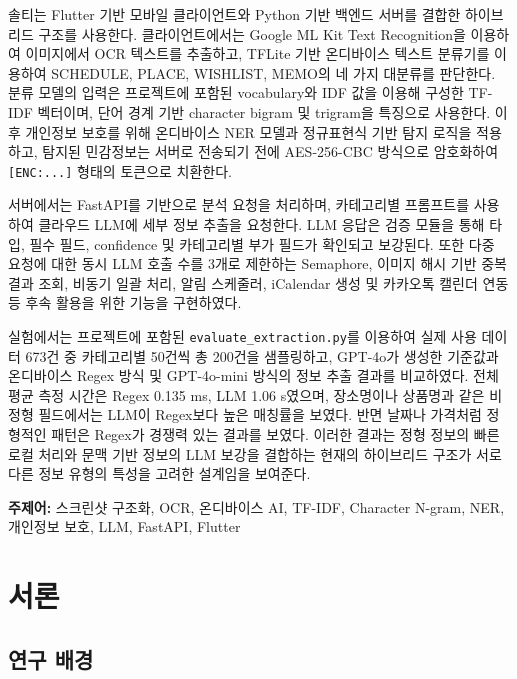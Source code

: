 \documentclass[11pt,a4paper]{article}
\begin{document}
솔티는 Flutter 기반 모바일 클라이언트\cite{ref_flutter}와 Python 기반 백엔드 서버를 결합한 하이브리드 구조를 사용한다. 클라이언트에서는 Google ML Kit Text Recognition을 이용하여 이미지에서 OCR 텍스트를 추출하고, TFLite 기반 온디바이스 텍스트 분류기를 이용하여 SCHEDULE, PLACE, WISHLIST, MEMO의 네 가지 대분류를 판단한다. 분류 모델의 입력은 프로젝트에 포함된 vocabulary와 IDF 값을 이용해 구성한 TF-IDF 벡터이며, 단어 경계 기반 character bigram 및 trigram을 특징으로 사용한다. 이후 개인정보 보호를 위해 온디바이스 NER 모델과 정규표현식 기반 탐지 로직을 적용하고, 탐지된 민감정보는 서버로 전송되기 전에 AES-256-CBC 방식으로 암호화하여 \texttt{[ENC:...]} 형태의 토큰으로 치환한다.

서버에서는 FastAPI를 기반으로 분석 요청을 처리하며, 카테고리별 프롬프트를 사용하여 클라우드 LLM에 세부 정보 추출을 요청한다. LLM 응답은 검증 모듈을 통해 타입, 필수 필드, confidence 및 카테고리별 부가 필드가 확인되고 보강된다. 또한 다중 요청에 대한 동시 LLM 호출 수를 3개로 제한하는 Semaphore, 이미지 해시 기반 중복 결과 조회, 비동기 일괄 처리, 알림 스케줄러, iCalendar 생성 및 카카오톡 캘린더 연동 등 후속 활용을 위한 기능을 구현하였다.

실험에서는 프로젝트에 포함된 \texttt{evaluate\_extraction.py}를 이용하여 실제 사용 데이터 673건 중 카테고리별 50건씩 총 200건을 샘플링하고, GPT-4o가 생성한 기준값과 온디바이스 Regex 방식 및 GPT-4o-mini 방식의 정보 추출 결과를 비교하였다. 전체 평균 측정 시간은 Regex 0.135 ms, LLM 1.06 s였으며, 장소명이나 상품명과 같은 비정형 필드에서는 LLM이 Regex보다 높은 매칭률을 보였다. 반면 날짜나 가격처럼 정형적인 패턴은 Regex가 경쟁력 있는 결과를 보였다. 이러한 결과는 정형 정보의 빠른 로컬 처리와 문맥 기반 정보의 LLM 보강을 결합하는 현재의 하이브리드 구조가 서로 다른 정보 유형의 특성을 고려한 설계임을 보여준다.

\textbf{주제어:} 스크린샷 구조화, OCR, 온디바이스 AI, TF-IDF, Character N-gram, NER, 개인정보 보호, LLM, FastAPI, Flutter

\newpage

\section{서론}

\subsection{연구 배경}
\end{document}
